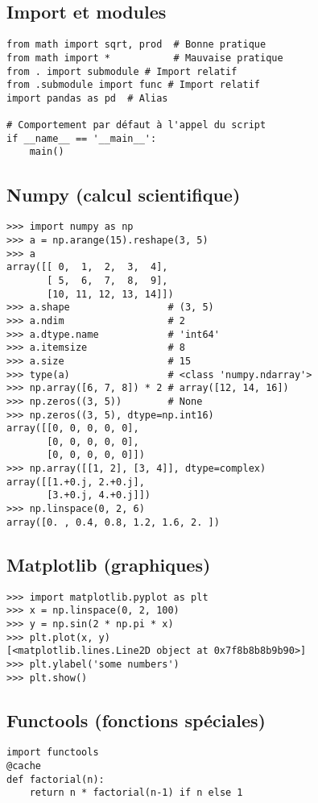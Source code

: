 \documentclass{article}
\begin{document}
\begin{multicols*}{4}
\section*{Import et modules}
\begin{lstlisting}
from math import sqrt, prod  # Bonne pratique
from math import *           # Mauvaise pratique
from . import submodule # Import relatif
from .submodule import func # Import relatif
import pandas as pd  # Alias

# Comportement par défaut à l'appel du script
if __name__ == '__main__':
    main()
\end{lstlisting}

\subsection*{Numpy (calcul scientifique)}
\begin{lstlisting}
>>> import numpy as np
>>> a = np.arange(15).reshape(3, 5)
>>> a
array([[ 0,  1,  2,  3,  4],
       [ 5,  6,  7,  8,  9],
       [10, 11, 12, 13, 14]])
>>> a.shape                 # (3, 5)
>>> a.ndim                  # 2
>>> a.dtype.name            # 'int64'
>>> a.itemsize              # 8
>>> a.size                  # 15
>>> type(a)                 # <class 'numpy.ndarray'>
>>> np.array([6, 7, 8]) * 2 # array([12, 14, 16])
>>> np.zeros((3, 5))        # None
>>> np.zeros((3, 5), dtype=np.int16)
array([[0, 0, 0, 0, 0],
       [0, 0, 0, 0, 0],
       [0, 0, 0, 0, 0]])
>>> np.array([[1, 2], [3, 4]], dtype=complex)
array([[1.+0.j, 2.+0.j],
       [3.+0.j, 4.+0.j]])
>>> np.linspace(0, 2, 6)
array([0. , 0.4, 0.8, 1.2, 1.6, 2. ])\end{lstlisting}

\subsection*{Matplotlib (graphiques)}
\begin{lstlisting}
>>> import matplotlib.pyplot as plt
>>> x = np.linspace(0, 2, 100)
>>> y = np.sin(2 * np.pi * x)
>>> plt.plot(x, y)
[<matplotlib.lines.Line2D object at 0x7f8b8b8b9b90>]
>>> plt.ylabel('some numbers')
>>> plt.show()\end{lstlisting}

\subsection*{Functools (fonctions spéciales)}
\begin{lstlisting}
import functools
@cache
def factorial(n):
    return n * factorial(n-1) if n else 1


\end{lstlisting}
\end{multicols*}
\end{document}
